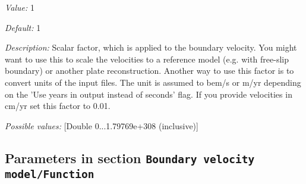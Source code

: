 \begin{itemize}
{\it Value:} 1


{\it Default:} 1


{\it Description:} Scalar factor, which is applied to the boundary velocity. You might want to use this to scale the velocities to a reference model (e.g. with free-slip boundary) or another plate reconstruction. Another way to use this factor is to convert units of the input files. The unit is assumed to bem/s or m/yr depending on the 'Use years in output instead of seconds' flag. If you provide velocities in cm/yr set this factor to 0.01.


{\it Possible values:} [Double 0...1.79769e+308 (inclusive)]
\end{itemize}

\subsection{Parameters in section \tt Boundary velocity model/Function}
\label{parameters:Boundary_20velocity_20model/Function}

